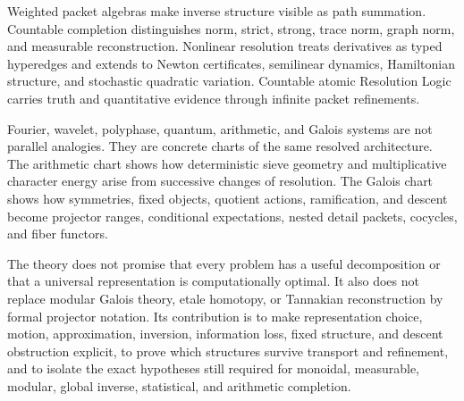 \documentclass{aomart}
\theoremstyle{definition}
\theoremstyle{remark}
\begin{document}
Weighted packet algebras make inverse structure visible as path summation. Countable completion distinguishes norm, strict, strong, trace norm, graph norm, and measurable reconstruction. Nonlinear resolution treats derivatives as typed hyperedges and extends to Newton certificates, semilinear dynamics, Hamiltonian structure, and stochastic quadratic variation. Countable atomic Resolution Logic carries truth and quantitative evidence through infinite packet refinements.

Fourier, wavelet, polyphase, quantum, arithmetic, and Galois systems are not parallel analogies. They are concrete charts of the same resolved architecture. The arithmetic chart shows how deterministic sieve geometry and multiplicative character energy arise from successive changes of resolution. The Galois chart shows how symmetries, fixed objects, quotient actions, ramification, and descent become projector ranges, conditional expectations, nested detail packets, cocycles, and fiber functors.

The theory does not promise that every problem has a useful decomposition or that a universal representation is computationally optimal. It also does not replace modular Galois theory, etale homotopy, or Tannakian reconstruction by formal projector notation. Its contribution is to make representation choice, motion, approximation, inversion, information loss, fixed structure, and descent obstruction explicit, to prove which structures survive transport and refinement, and to isolate the exact hypotheses still required for monoidal, measurable, modular, global inverse, statistical, and arithmetic completion.


\nocite{*}

\end{document}
